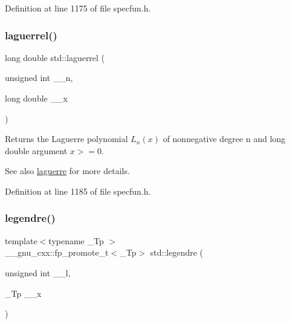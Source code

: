 Definition at line 1175 of file specfun.\+h.

\mbox{\label{group__cxx17__math__spec__func_gaaf8b141edf9163b37ea4f2ed3e0191fc}} 
\subsubsection{\texorpdfstring{laguerrel()}{laguerrel()}}
{\footnotesize\ttfamily long double std\+::laguerrel (\begin{DoxyParamCaption}\item[{unsigned int}]{\+\_\+\+\_\+n,  }\item[{long double}]{\+\_\+\+\_\+x }\end{DoxyParamCaption})\hspace{0.3cm}{\ttfamily [inline]}}

Returns the Laguerre polynomial $ L_n(x) $ of nonnegative degree {\ttfamily n} and {\ttfamily long double} argument $ x >= 0 $.

\begin{DoxySeeAlso}{See also}
\hyperlink{group__cxx17__math__spec__func_ga9d7b24a11dad27690387405548973ef9}{laguerre} for more details. 
\end{DoxySeeAlso}


Definition at line 1185 of file specfun.\+h.

\mbox{\label{group__cxx17__math__spec__func_gad06811f4e139b0ba84235c1f0d34d86e}} 
\subsubsection{\texorpdfstring{legendre()}{legendre()}}
{\footnotesize\ttfamily template$<$typename \+\_\+\+Tp $>$ \\
\+\_\+\+\_\+gnu\+\_\+cxx\+::fp\+\_\+promote\+\_\+t$<$\+\_\+\+Tp$>$ std\+::legendre (\begin{DoxyParamCaption}\item[{unsigned int}]{\+\_\+\+\_\+l,  }\item[{\+\_\+\+Tp}]{\+\_\+\+\_\+x }\end{DoxyParamCaption})\hspace{0.3cm}{\ttfamily [inline]}}

